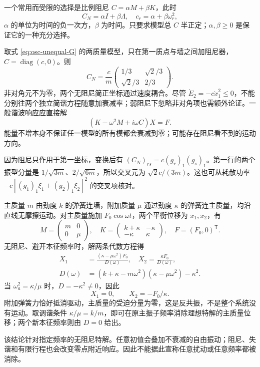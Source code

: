 一个常用而受限的选择是比例阻尼 $C=\alpha M+\beta K$，此时
\[
C_N=\alpha I+\beta\Lambda,\quad c_r=\alpha+\beta\omega_r^2,
\]
$\alpha$ 的单位为时间的负一次方，$\beta$ 为时间。只要求模型总 $C$ 半正定；$\alpha,\beta\ge0$ 是保证它的一种充分选择。

\begin{example}[一个局部阻尼器一般耦合无阻尼模]
取式 \eqref{eq:osc-unequal-G} 的两质量模型，只在第一质点与墙之间加阻尼器，$C=\operatorname{diag}(c,0)$。则
\[
C_N=\frac c m\begin{pmatrix}1/3&\sqrt2/3\\\sqrt2/3&2/3\end{pmatrix}.
\]
非对角元不为零，两个无阻尼简正坐标通过速度耦合。尽管 $\dot E_2=-c\dot x_1^2\le0$，不能分别往两个独立简谐方程随意加衰减率；弱阻尼下忽略非对角项也需额外论证。一般谐波响应应直接解
\[
(K-\omega^2M+i\omega C)X=F.
\]
能量不增本身不保证任一模型的所有模都会衰减到零；可能存在阻尼看不到的运动方向。

因为阻尼只作用于第一坐标，变换后有 $(C_N)_{rs}=c(g_r)_1(g_s)_1$。第一行的两个振型分量是 $1/\sqrt{3m}$、$2/\sqrt{6m}$，所以交叉元为 $\sqrt2c/(3m)$。这也可从耗散功率 $-c[(g_1)_1\dot\xi_1+(g_2)_1\dot\xi_2]^2$ 的交叉项核对。
\end{example}

\begin{example}
主质量 $m$ 由劲度 $k$ 的弹簧连墙，附加质量 $\mu$ 通过劲度 $\kappa$ 的弹簧连主质量，均沿直线无摩擦运动。对主质量施加 $F_0\cos\omega t$，两个平衡位移为 $x_1,x_2$，有
\[
M=\begin{pmatrix}m&0\\0&\mu\end{pmatrix},\quad
K=\begin{pmatrix}k+\kappa&-\kappa\\-\kappa&\kappa\end{pmatrix},\quad
F=(F_0,0)^{\mathsf T}.
\]
无阻尼、避开本征频率时，解两条代数方程得
\begin{align*}
X_1&=\frac{(\kappa-\mu\omega^2)F_0}{D(\omega)},\quad
X_2=\frac{\kappa F_0}{D(\omega)},\\
D(\omega)&=(k+\kappa-m\omega^2)(\kappa-\mu\omega^2)-\kappa^2.
\end{align*}
当 $\omega_a^2=\kappa/\mu$ 时，$D=-\kappa^2\ne0$，因此
\[
X_1=0,\qquad X_2=-F_0/\kappa.
\]
附加弹簧力恰好抵消驱动，主质量的受迫分量为零，这是反共振，不是整个系统没有运动。取调谐条件 $\kappa/\mu=k/m$，即可在原主振子频率消除理想特解的主质量位移；两个新本征频率则由 $D=0$ 给出。

该结论针对指定频率的无阻尼特解。任意初值会叠加不衰减的自由振动；阻尼、失谐和有限行程也会改变零点附近响应。因此不能据此宣称任意扰动或任意频率都被消除。
\end{example}

